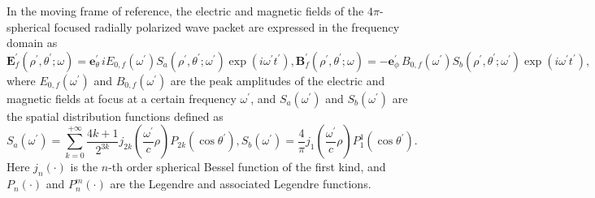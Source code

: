 \documentclass[10pt, a4paper, twoside, openright]{report}
\renewcommand{\vec}[1]{\mathbf{#1}}
\begin{document}
In the moving frame of reference, the electric and magnetic fields of the $ 4 \pi $-spherical focused radially polarized wave packet are expressed in the frequency domain as \cite{Jeong2020, Jeong2021}
\begin{subequations}
\begin{equation}\label{key}
\vec{E}^{\prime}_{f} \left( \rho^{\prime}, \theta^{\prime}; \omega \right) = \vec{e}_{\theta}^{\prime} \, i E_{0, f} \left( \omega^{\prime} \right) S_a \left( \rho^{\prime}, \theta^{\prime}; \omega^{\prime} \right) \exp \left(i \omega^{\prime} t^{\prime} \right),
\end{equation}
\begin{equation}\label{key}
\vec{B}^{\prime}_{f} \left( \rho^{\prime}, \theta^{\prime}; \omega \right) = - \vec{e}_{\phi}^{\prime} \, B_{0, f} \left( \omega^{\prime} \right) S_b \left( \rho^{\prime}, \theta^{\prime}; \omega^{\prime} \right) \exp \left(i \omega^{\prime} t^{\prime} \right),
\end{equation}
\end{subequations}
where $ E_{0, f} \left( \omega^{\prime} \right) $ and $ B_{0, f} \left( \omega^{\prime} \right) $ are the peak amplitudes of the electric and magnetic fields at focus at a certain frequency $ \omega^{\prime} $, and $ S_a \left( \omega^{\prime} \right) $ and $ S_b \left( \omega^{\prime} \right) $ are the spatial distribution functions defined as
\begin{subequations}
	\begin{equation}\label{key}
S_a \left( \omega^{\prime} \right) = \sum_{k = 0}^{+\infty} \frac{4k + 1}{2^{3k}} j_{2k} \left( \frac{\omega^{\prime}}{c} \rho \right) P_{2k} \left( \cos \theta^{\prime} \right),
	\end{equation}
	\begin{equation}\label{key}
S_b \left( \omega^{\prime} \right) = \frac{4}{\pi} j_1 \left( \frac{\omega^{\prime}}{c} \rho \right) P^1_1 \left( \cos \theta^{\prime} \right).
	\end{equation}
\end{subequations}
Here $ j_{n} \left( \cdot \right) $ is the $ n $-th order spherical Bessel function of the first kind, and $ P_n \left( \cdot \right) $ and $ P^m_n \left( \cdot \right) $ are the Legendre and associated Legendre functions.
\end{document}
